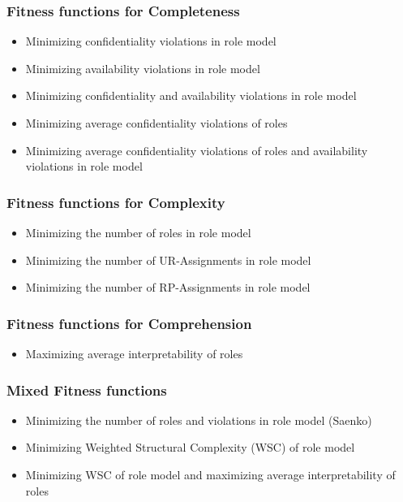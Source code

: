         \subsubsection{Fitness functions for Completeness}
        \begin{itemize}
            \item{Minimizing confidentiality violations in role model}
            \item{Minimizing availability violations in role model}
            \item{Minimizing confidentiality and availability violations in role model}
            \item{Minimizing average confidentiality violations of roles}
            \item{Minimizing average confidentiality violations of roles and availability violations in role model}
        \end{itemize}
        \subsubsection{Fitness functions for Complexity}
        \begin{itemize}
            \item{Minimizing the number of roles in role model}
            \item{Minimizing the number of UR-Assignments in role model}
            \item{Minimizing the number of RP-Assignments in role model}
        \end{itemize}
        \subsubsection{Fitness functions for Comprehension}
        \begin{itemize}
            \item{Maximizing average interpretability of roles}
        \end{itemize}
        \subsubsection{Mixed Fitness functions}
        \begin{itemize}
            \item{Minimizing the number of roles and violations in role model (Saenko)}
            \item{Minimizing Weighted Structural Complexity (WSC) of role model}
            \item{Minimizing WSC of role model and maximizing average interpretability of roles}
        \end{itemize}
    
